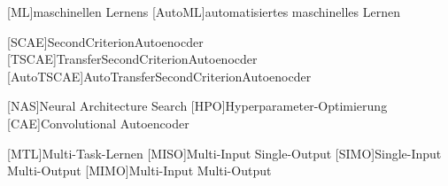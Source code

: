 \begin{acronym}[IEEE]
	[ML]{maschinellen Lernens}
	[AutoML]{automatisiertes maschinelles Lernen}
	
	[SCAE]{SecondCriterionAutoenocder}
	[TSCAE]{TransferSecondCriterionAutoenocder}
	[AutoTSCAE]{AutoTransferSecondCriterionAutoenocder}
	
	[NAS]{Neural Architecture Search}
	[HPO]{Hyperparameter-Optimierung}	
	[CAE]{Convolutional Autoencoder}	
	
	
	[MTL]{Multi-Task-Lernen}		
	[MISO]{Multi-Input Single-Output}	
	[SIMO]{Single-Input Multi-Output}	
	[MIMO]{Multi-Input Multi-Output}	
\end{acronym}
